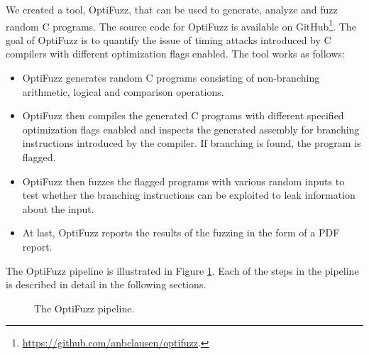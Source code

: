 We created a tool, OptiFuzz, that can be used to generate, analyze and fuzz random C programs.
The source code for OptiFuzz is available on GitHub\footnote{\url{https://github.com/anbclausen/optifuzz}.}.
The goal of OptiFuzz is to quantify the issue of timing attacks introduced by C compilers with different optimization flags enabled.
The tool works as follows:
\begin{itemize}
  \item OptiFuzz generates random C programs consisting of non-branching arithmetic, logical and comparison operations.
  \item OptiFuzz then compiles the generated C programs with different specified optimization flags enabled and inspects the generated assembly for branching instructions introduced by the compiler.
        If branching is found, the program is flagged.
  \item OptiFuzz then fuzzes the flagged programs with various random inputs to test whether the branching instructions can be exploited to leak information about the input.
  \item At last, OptiFuzz reports the results of the fuzzing in the form of a PDF report.
\end{itemize}
The OptiFuzz pipeline is illustrated in Figure \ref{fig:optifuzz-pipeline}. 
Each of the steps in the pipeline is described in detail in the following sections.
\begin{figure}[H]
  \centering
  
  \caption{The OptiFuzz pipeline.}
  \label{fig:optifuzz-pipeline}
\end{figure}



